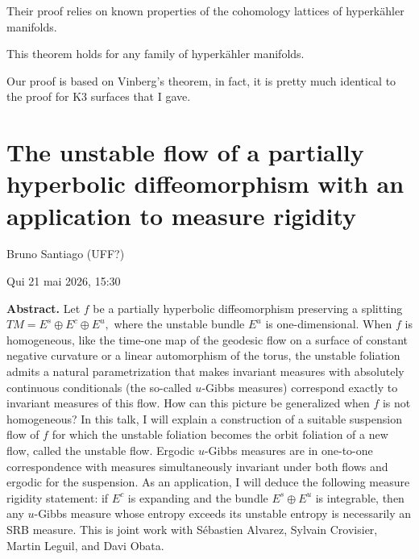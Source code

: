 \begin{remark}
\label{remark-dorv-lattices}
Their proof relies on known properties of the
cohomology lattices of hyperkähler manifolds.
\end{remark}

\begin{theorem}
\label{theorem-amerik-soldatenkov-v}
This theorem holds for any family of hyperkähler
manifolds.
\end{theorem}

\begin{remark}
\label{remark-asv-vinberg}
Our proof is based on Vinberg's theorem, in fact,
it is pretty much identical to the proof for K3
surfaces that I gave.
\end{remark}


\section{The unstable flow of a partially 
hyperbolic diffeomorphism with an 
application to measure rigidity}
\label{section-unstable-flow-hyp-dyn}

\noindent
Bruno Santiago (UFF?)

Qui 21 mai 2026, 15:30

\medskip\noindent
{\bf Abstract.}
Let $f$ be a partially hyperbolic
diffeomorphism preserving a splitting
$
TM = E^s \oplus E^c \oplus E^u,
$
where the unstable bundle $E^u$ is
one-dimensional.
When $f$ is homogeneous, like the time-one
map of the geodesic flow on a surface of
constant negative curvature or a linear
automorphism of the torus, the unstable
foliation admits a natural parametrization
that makes invariant measures with
absolutely continuous conditionals
(the so-called $u$-Gibbs measures)
correspond exactly to invariant measures
of this flow.
How can this picture be generalized when
$f$ is not homogeneous?
In this talk, I will explain a construction
of a suitable suspension flow of $f$ for
which the unstable foliation becomes the
orbit foliation of a new flow, called the
unstable flow.
Ergodic $u$-Gibbs measures are in
one-to-one correspondence with measures
simultaneously invariant under both flows
and ergodic for the suspension.
As an application, I will deduce the
following measure rigidity statement:
if $E^c$ is expanding and the bundle
$E^s \oplus E^u$ is integrable, then any
$u$-Gibbs measure whose entropy exceeds its
unstable entropy is necessarily an SRB
measure.
This is joint work with Sébastien
Alvarez, Sylvain Crovisier, Martin
Leguil, and Davi Obata.

